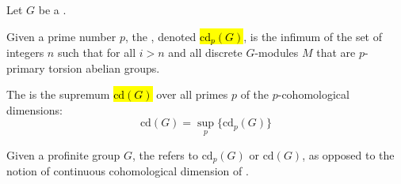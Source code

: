 \begin{definition} \label{definition:p_cohomological_dimension_of_a_topological_group}
Let $G$ be a . 

Given a prime number $p$, the , denoted \hl{$\text{cd}_p(G)$}, is the infimum of the set of integers $n$ such that  for all $i > n$ and all discrete $G$-modules $M$ that are $p$-primary torsion abelian groups.

The  is the supremum \hl{$\text{cd}(G)$} over all primes $p$ of the $p$-cohomological dimensions:
$$\text{cd}(G) = \sup_p \{ \text{cd}_p(G) \}$$

Given a profinite group $G$, the  refers to $\text{cd}_p(G)$ or $\text{cd}(G)$, as opposed to the notion of continuous cohomological dimension of .
\end{definition}